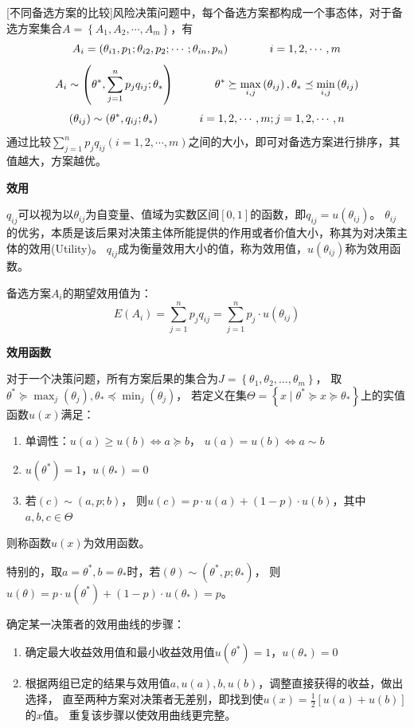 \documentclass[a4paper,12pt]{article}
\begin{document}
[不同备选方案的比较]风险决策问题中，每个备选方案都构成一个事态体，对于备选方案集合$A=\left\{A_1,A_2,\cdots,A_m\right\}$，有
$$
A_i=\left(\theta_{i1},p_1;\theta_{i2},p_2;\cdots;\theta_{in},p_n\right)\kern 36pt i=1,2,\cdots,m
$$
$$
A_i\sim \left(\theta^*,\sum_{j=1}^np_jq_{ij};\theta_*\right)\kern 36pt
\theta^*\succeq\max_{i,j}\left(\theta_{ij}\right),\theta_*\preceq\min_{i,j}\left(\theta_{ij}\right)
$$
$$
\left(\theta_{ij}\right)\sim\left(\theta^*,q_{ij};\theta_*\right)\kern 36pt i=1,2,\cdots,m;j=1,2,\cdots,n
$$
通过比较$\sum_{j=1}^np_jq_{ij}(i=1,2,\cdots,m)$之间的大小，即可对备选方案进行排序，其值越大，方案越优。

\noindent
\textbf{效用}

$q_{ij}$可以视为以$\theta_{ij}$为自变量、值域为实数区间$\left[0,1\right]$的函数，即$q_{ij}=u\left(\theta_{ij}\right)$。
$\theta_{ij}$的优劣，本质是该后果对决策主体所能提供的作用或者价值大小，称其为对决策主体的效用(Utility)。
$q_{ij}$成为衡量效用大小的值，称为效用值，$u\left(\theta_{ij}\right)$称为效用函数。

备选方案$A_i$的期望效用值为：
$$
E\left(A_i\right)=\sum_{j=1}^np_jq_{ij}=\sum_{j=1}^np_j\cdot u\left(\theta_{ij}\right)
$$

\noindent
\textbf{效用函数}

对于一个决策问题，所有方案后果的集合为$J=\left\{\theta_1,\theta_2,\dots,\theta_m\right\}$，
取$\theta^*\succeq\max_j\left(\theta_j\right),\theta_*\preceq\min_j\left(\theta_j\right)$，
若定义在集$\Theta=\left\{x\mid\theta^*\succeq x\succeq\theta_*\right\}$上的实值函数$u\left(x\right)$满足：
\begin{enumerate}[itemsep=0pt,parsep=0pt]
    \item 单调性：$u\left(a\right)\ge u\left(b\right)\Leftrightarrow a\succeq b$，
    $u\left(a\right)=u\left(b\right)\Leftrightarrow a\sim b$
    \item $u\left(\theta^*\right)=1$，$u\left(\theta_*\right)=0$
    \item 若$\left(c\right)\sim\left(a,p;b\right)$，
    则$u\left(c\right)=p\cdot u\left(a\right)+(1-p)\cdot u\left(b\right)$，其中$a,b,c\in\Theta$
\end{enumerate} 
则称函数$u\left(x\right)$为效用函数。

特别的，取$a=\theta^*,b=\theta_*$时，若$\left(\theta\right)\sim\left(\theta^*,p;\theta_*\right)$，
则$u\left(\theta\right)=p\cdot u\left(\theta^*\right)+(1-p)\cdot u\left(\theta_*\right)=p$。

确定某一决策者的效用曲线的步骤：
\begin{enumerate}[itemsep=0pt,parsep=0pt]
    \item 确定最大收益效用值和最小收益效用值$u\left(\theta^*\right)=1$，$u\left(\theta_*\right)=0$
    \item 根据两组已定的结果与效用值$a,u\left(a\right),b,u\left(b\right)$，调整直接获得的收益，做出选择，
    直至两种方案对决策者无差别，即找到使$u\left(x\right)=\frac{1}{2}\left[u\left(a\right)+u\left(b\right)\right]$的$x$值。
    重复该步骤以使效用曲线更完整。
\end{enumerate} 
  
\end{document}
